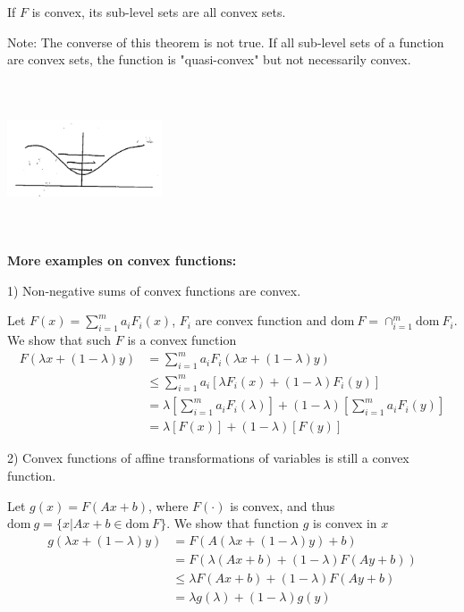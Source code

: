 \begin{theorem}
	If $F$ is convex, its sub-level sets are all convex sets.
\end{theorem}
Note: The converse of this theorem is not true. If all sub-level sets of a function are convex sets, the function is "quasi-convex" but not necessarily convex.\\

\begin{marginfigure}
	\centering
	\includegraphics[width=1.8in,height=1.8in]{figures/ch08/figure1030_13.png}
\end{marginfigure}

\vspace{0.3cm}
\textbf{More examples on convex functions:}

1) Non-negative sums of convex functions are convex.

Let $F(x) =\sum^m_{i=1}a_iF_i(x)$, $F_i$ are convex function and $\text{dom}\ F = \cap^m_{i=1}\text{dom}\ F_i$. We show that such $F$ is a convex function
\begin{align*}
F(\lambda x + (1-\lambda)y) 
&= \sum^m_{i=1}a_iF_i(\lambda x + (1-\lambda)y)\\
&\leq \sum^m_{i=1}a_i[\lambda F_i(x) + (1-\lambda)F_i(y)]\\
&= \lambda[\sum^m_{i=1}a_iF_i(\lambda)] + (1-\lambda)[\sum^m_{i=1}a_iF_i(y)]\\
&= \lambda[F(x)] + (1-\lambda)[F(y)]
\end{align*}

2) Convex functions of affine transformations of variables is still a convex function.

Let $g(x) =F(Ax + b)$, where $F(\cdot)$ is convex, and thus $\text{dom}\ g = \{x|Ax + b \in\text{dom}\ F \}$. We show that function $g$ is convex in $x$
\begin{align*}
g(\lambda x + (1-\lambda)y) &= F(A(\lambda x + (1-\lambda)y) + b)\\
&= F(\lambda(Ax + b) + (1-\lambda)F(Ay+b))\\
&\leq \lambda F(Ax + b) + (1-\lambda)F(Ay+b)\\
&= \lambda g(\lambda) + (1-\lambda)g(y)
\end{align*}


